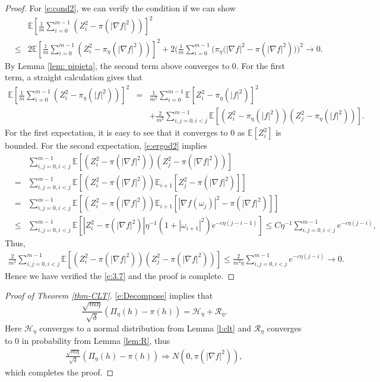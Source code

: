 \documentclass[12pt]{amsart}
\theoremstyle{definition}
\theoremstyle{remark}
\numberwithin{equation}{section}
\newcommand{\E}{\mathbb{E}}            %
\begin{document}
\begin{proof}
	For \eqref{e:cond2}, we can verify the condition if we can show
	\begin{eqnarray}\label{e:3.7}
		&&\E[\frac1m\sum_{i=0}^{m-1}\left(Z_i^2-\pi(|\nabla f|^2)\right)]^2\\
		&\le&2\E[\frac1m\sum_{i=0}^{m-1}\left(Z_i^2-\pi_\eta(|\nabla f|^2)\right)]^2
		+2\Big(\frac1m\sum_{i=0}^{m-1}\big(\pi_\eta(|\nabla f|^2-\pi(|\nabla f|^2)\big)\Big)^2\to 0.\nonumber
	\end{eqnarray}
	By Lemma \ref{lem: pipieta}, the second term above converges to $0$.  For the first term, a straight calculation gives that
	\begin{eqnarray*}
		\E[\frac1m\sum_{i=0}^{m-1}\left(Z_i^2-\pi_\eta(|f|^2)\right)]^2
		&=&\frac1{m^2}\sum_{i=0}^{m-1}\E[Z_i^2-\pi_\eta(|f|^2)]^2\\
		&&+\frac2{m^2}\sum_{i,j=0,i<j}^{m-1}\E\left[(Z_i^2-\pi_\eta(|f|^2))(Z_j^2-\pi_\eta(|f|^2))\right].
	\end{eqnarray*}
	For the first expectation, it is easy to see that it converges to $0$ as $\E[Z_i^2]$ is bounded. For the second expectation, \eqref{e:ergod2} implies
	\begin{eqnarray*}
		&&\sum_{i,j=0,i<j}^{m-1}\E\left[(Z_i^2-\pi(|\nabla f|^2))(Z_j^2-\pi(|\nabla f|^2))\right]\\
		&=&\sum_{i,j=0,i<j}^{m-1}\E\left[(Z_i^2-\pi(|\nabla f|^2))\E_{i+1}[Z_j^2-\pi(|\nabla f|^2)]\right]\\
		&=&\sum_{i,j=0,i<j}^{m-1}\E\left[(Z_i^2-\pi(|\nabla f|^2))\E_{i+1}[|\nabla f(\omega_j)|^2-\pi(|\nabla f|^2)]\right]\\
		&\le&\sum_{i,j=0,i<j}^{m-1}\E\left[|Z_i^2-\pi(|\nabla f|^2)|\eta^{-1}(1+|\omega_{i+1}|^2) e^{-c\eta(j-i-1)} \right]\le C\eta^{-1}\sum_{i,j=0,i<j}^{m-1} e^{-c\eta(j-i)},
	\end{eqnarray*}
	Thus,
	\begin{eqnarray*}
		\frac2{m^2}\sum_{i,j=0,i<j}^{m-1}\E\left[(Z_i^2-\pi(|\nabla f|^2))(Z_j^2-\pi(|\nabla f|^2))\right]
		\le\frac{2}{m^2\eta}\sum_{i,j=0,i<j}^{m-1}e^{-c\eta(j-i)}\to0.
	\end{eqnarray*}
	Hence we have verified the \eqref{e:3.7} and the proof is complete.
\end{proof}

\begin{proof}[Proof of Theorem \ref{thm-CLT}]
\eqref{e:Decompose} implies that
\begin{equation*}
\frac{\sqrt{m\eta}}{\sqrt\delta}(\Pi_\eta(h)-\pi(h))= \mathcal{H}_\eta+\mathcal{R}_\eta.
\end{equation*}
Here $ \mathcal{H}_\eta$ converges to a normal distribution from Lemma \ref{l:clt} and 
$ \mathcal{R}_\eta$ converges to $0$ in probability  from Lemma \ref{lem:R}, thus
	\begin{align*}
	\frac{\sqrt{m\eta}}{\sqrt\delta}(\Pi_\eta(h)-\pi(h))\Rightarrow N(0,\pi(|\nabla f|^2)),
\end{align*}
which completes the proof.
\end{proof}
\fi
\end{document}
